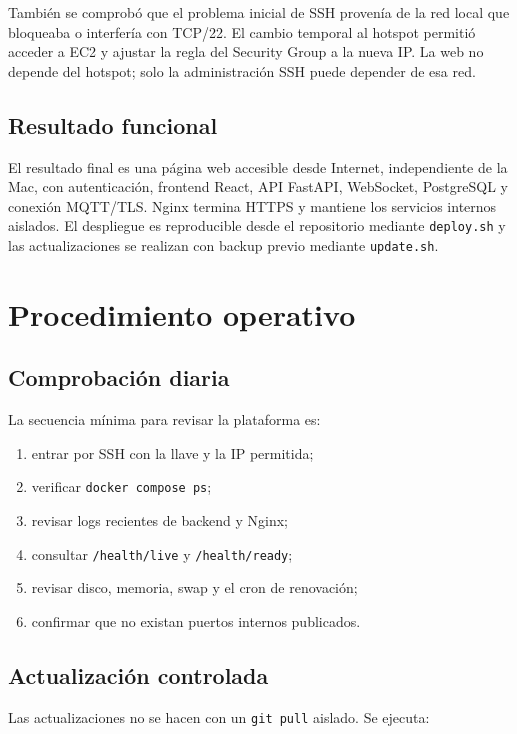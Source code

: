 \documentclass[12pt,a4paper,oneside]{report}
\newcommand{\code}[1]{\texttt{\small #1}}
\begin{document}
También se comprobó que el problema inicial de SSH provenía de la red local que
bloqueaba o interfería con TCP/22. El cambio temporal al hotspot permitió acceder
a EC2 y ajustar la regla del Security Group a la nueva IP. La web no depende del
hotspot; solo la administración SSH puede depender de esa red.

\section{Resultado funcional}

El resultado final es una página web accesible desde Internet, independiente de la
Mac, con autenticación, frontend React, API FastAPI, WebSocket, PostgreSQL y
conexión MQTT/TLS. Nginx termina HTTPS y mantiene los servicios internos aislados.
El despliegue es reproducible desde el repositorio mediante \code{deploy.sh} y las
actualizaciones se realizan con backup previo mediante \code{update.sh}.

\chapter{Procedimiento operativo}

\section{Comprobación diaria}

La secuencia mínima para revisar la plataforma es:

\begin{enumerate}
  \item entrar por SSH con la llave y la IP permitida;
  \item verificar \code{docker compose ps};
  \item revisar logs recientes de backend y Nginx;
  \item consultar \code{/health/live} y \code{/health/ready};
  \item revisar disco, memoria, swap y el cron de renovación;
  \item confirmar que no existan puertos internos publicados.
\end{enumerate}

\section{Actualización controlada}

Las actualizaciones no se hacen con un \code{git pull} aislado. Se ejecuta:
\end{document}
